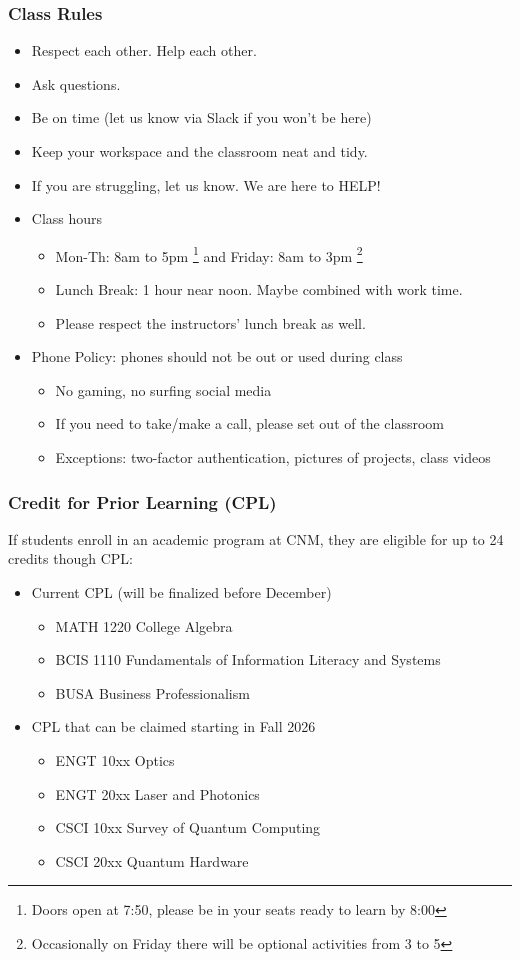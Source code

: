 \documentclass{beamer}
\begin{document}
\begin{frame}\frametitle{Class Rules}
\begin{itemize}
\item Respect each other. Help each other.
\item Ask questions. 
\item Be on time (let us know via Slack if you won't be here) 
\item Keep your workspace and the classroom neat and tidy.
\item If you are struggling, let us know. We are here to HELP!
\item Class hours
\begin{itemize}
\item Mon-Th: 8am to 5pm \footnote{Doors open at 7:50, please be in your seats ready to learn by 8:00} and Friday: 8am to 3pm \footnote{Occasionally on Friday there will be optional activities from 3 to 5}
\item Lunch Break: 1 hour near noon. Maybe combined with work time. 
\item Please respect the instructors' lunch break as well.
\end{itemize}
\item Phone Policy: phones should not be out or used during class
\begin{itemize}
\item No gaming, no surfing social media
\item If you need to take/make a call, please set out of the classroom
\item Exceptions: two-factor authentication, pictures of projects, class videos
\end{itemize}
\end{itemize}
\end{frame}

\begin{frame}\frametitle{Credit for Prior Learning (CPL)}
If students enroll in an academic program at CNM, they are eligible for up to 24 credits though CPL:

\begin{itemize}
\item Current CPL (will be finalized before December)
\begin{itemize}
\item MATH 1220 College Algebra
\item BCIS 1110 Fundamentals of Information Literacy and Systems
\item BUSA Business Professionalism
\end{itemize}
\item CPL that can be claimed starting in Fall 2026
\begin{itemize}
\item ENGT 10xx Optics
\item ENGT 20xx Laser and Photonics
\item CSCI 10xx Survey of Quantum Computing
\item CSCI 20xx Quantum Hardware
\end{itemize}
\end{itemize}
\end{frame}
\end{document}
